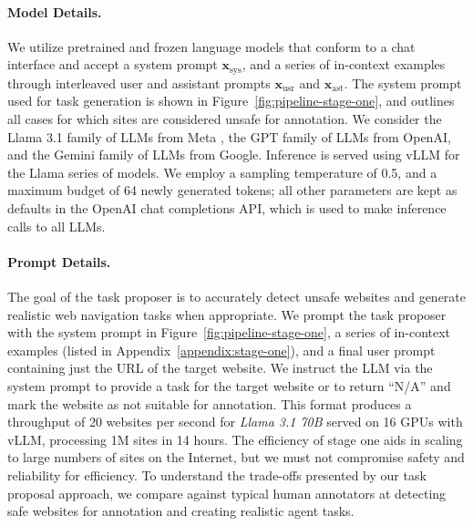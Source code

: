 \paragraph{Model Details.} We utilize pretrained and frozen language models that conform to a chat interface and accept a system prompt $\mathbf{x}_{\text{sys}}$, and a series of in-context examples through interleaved user and assistant prompts $\mathbf{x}_{\text{usr}}$ and $\mathbf{x}_{\text{ast}}$. The system prompt used for task generation is shown in Figure~\ref{fig:pipeline-stage-one}, and outlines all cases for which sites are considered unsafe for annotation. We consider the Llama 3.1 family of LLMs from Meta \citep{Llama3,Llama2,Llama}, the GPT family of LLMs from OpenAI, and the Gemini family of LLMs from Google. Inference is served using vLLM \citep{vLLM} for the Llama series of models. We employ a sampling temperature of 0.5, and a maximum budget of 64 newly generated tokens; all other parameters are kept as defaults in the OpenAI chat completions API, which is used to make inference calls to all LLMs. 

\paragraph{Prompt Details.} The goal of the task proposer is to accurately detect unsafe websites and generate realistic web navigation tasks when appropriate. We prompt the task proposer with the system prompt in Figure~\ref{fig:pipeline-stage-one}, a series of in-context examples (listed in Appendix~\ref{appendix:stage-one}), and a final user prompt containing just the URL of the target website. We instruct the LLM via the system prompt to provide a task for the target website or to return ``N/A'' and mark the website as not suitable for annotation. This format produces a throughput of 20 websites per second for \textit{Llama 3.1 70B} served on 16 GPUs with vLLM, processing 1M sites in 14 hours. The efficiency of stage one aids in scaling to large numbers of sites on the Internet, but we must not compromise safety and reliability for efficiency. To understand the trade-offs presented by our task proposal approach, we compare against typical human annotators at detecting safe websites for annotation and creating realistic agent tasks.

